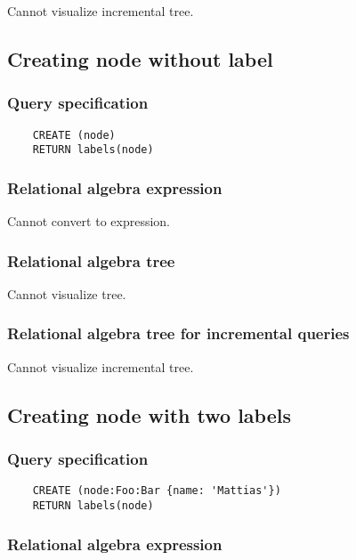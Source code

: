 	Cannot visualize incremental tree.
	\subsection{Creating node without label}

	\subsubsection*{Query specification}

	\begin{lstlisting}
	CREATE (node)
	RETURN labels(node)
	\end{lstlisting}


	\subsubsection*{Relational algebra expression}

	Cannot convert to expression.

	\subsubsection*{Relational algebra tree}

	Cannot visualize tree.

	\subsubsection*{Relational algebra tree for incremental queries}

	Cannot visualize incremental tree.
	\subsection{Creating node with two labels}

	\subsubsection*{Query specification}

	\begin{lstlisting}
	CREATE (node:Foo:Bar {name: 'Mattias'})
	RETURN labels(node)
	\end{lstlisting}


	\subsubsection*{Relational algebra expression}

